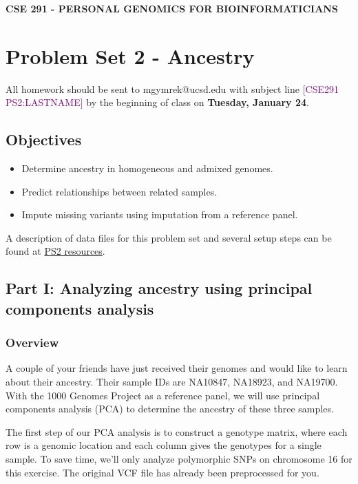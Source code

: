 \documentclass[12pt]{article}
\begin{document}
\textbf{CSE 291 - PERSONAL GENOMICS FOR BIOINFORMATICIANS}

\section*{Problem Set 2 - Ancestry}

All homework should be sent to mgymrek@ucsd.edu with subject line \textcolor{purple}{[CSE291 PS2:LASTNAME]} by the beginning of class on \textbf{Tuesday, January 24}. 

\subsection*{Objectives}
\begin{itemize}
\item Determine ancestry in homogeneous and admixed genomes.
\item Predict relationships between related samples.
\item Impute missing variants using imputation from a reference panel.
\end{itemize}

A description of data files for this problem set and several setup steps can be found at \href{https://gymreklab.github.io/teaching/personal\_genomics/ps2\_resources.html}{PS2 resources}. 

\subsection*{Part I: Analyzing ancestry using principal components analysis}

\subsubsection*{Overview}

A couple of your friends have just received their genomes and would like to learn about their ancestry. Their sample IDs are NA10847, NA18923, and NA19700. With the 1000 Genomes Project as a reference panel, we will use principal components analysis (PCA) to determine the ancestry of these three samples.

The first step of our PCA analysis is to construct a genotype matrix, where each row is a genomic location and each column gives the genotypes for a single sample. To save time, we'll only analyze polymorphic SNPs on chromosome 16 for this exercise. The original VCF file has already been preprocessed for you.
\end{document}
